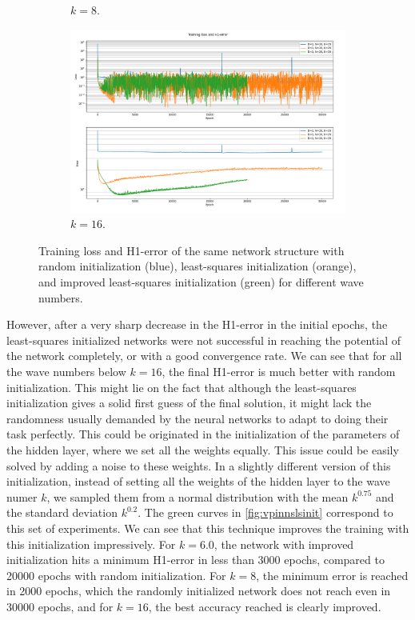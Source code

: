 \begin{figure}[h!]
\begin{subfigure}[b]{0.48\textwidth}
        \caption{$k=8$.}
        \label{fig:vpinnslsinitk8}
    \end{subfigure}
    \hfill
    \begin{subfigure}[b]{0.48\textwidth}
        \includegraphics[width=\textwidth]{img/VPINN-Comparison-lsinitk16.png}
        \caption{$k=16$.}
        \label{fig:vpinnslsinitk16}
    \end{subfigure}
    \caption{Training loss and H1-error of the same network structure with random initialization (blue), least-squares initialization (orange), and improved least-squares initialization (green) for different wave numbers.}
    \label{fig:vpinnslsinit}
\end{figure}

However, after a very sharp decrease in the H1-error in the initial epochs, the least-squares initialized networks were not successful in reaching the potential of the network completely, or with a good convergence rate. We can see that for all the wave numbers below $k=16$, the final H1-error is much better with random initialization. This might lie on the fact that although the least-squares initialization gives a solid first guess of the final solution, it might lack the randomness usually demanded by the neural networks to adapt to doing their task perfectly. This could be originated in the initialization of the parameters of the hidden layer, where we set all the weights equally. This issue could be easily solved by adding a noise to these weights. In a slightly different version of this initialization, instead of setting all the weights of the hidden layer to the wave numer $k$, we sampled them from a normal distribution with the mean $k^{0.75}$ and the standard deviation $k^{0.2}$. The green curves in \autoref{fig:vpinnslsinit} correspond to this set of experiments. We can see that this technique improves the training with this initialization impressively. For $k=6.0$, the network with improved initialization hits a minimum H1-error in less than 3000 epochs, compared to 20000 epochs with random initialization. For $k=8$, the minimum error is reached in 2000 epochs, which the randomly initialized network does not reach even in 30000 epochs, and for $k=16$, the best accuracy reached is clearly improved.

